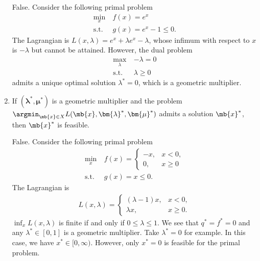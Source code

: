 \begin{exercise}
\begin{enumerate}
            \begin{solution}
                False. Consider the following primal problem
                \begin{align*}
                    \min_x\       & f(x) = e^x            \\
                    \text{s.t.}\  & g(x) = e^x - 1 \le 0.
                \end{align*}
                The Lagrangian is $L(x, \lambda) = e^x + \lambda e^x - \lambda$, whose infimum with respect to $x$ is $- \lambda$ but cannot be attained. However, the dual problem
                \begin{align*}
                    \max_{\lambda}\  & -\lambda = 0  \\
                    \text{s.t.}\     & \lambda \ge 0
                \end{align*}
                admits a unique optimal solution $\lambda^* = 0$, which is a geometric multiplier.
                \qedhere
            \end{solution}


        \item If $(\bm{\lambda}^*,\bm{\mu}^*)$ is a geometric multiplier and the problem $\argmin_{\mb{x}\in X} L(\mb{x}, \bm{\lambda}^*,\bm{\mu}^*)$ admits a solution $\mb{x}^*$, then $\mb{x}^*$ is feasible.

            \begin{solution}
                False. Consider the following primal problem
                \begin{align*}
                    \min_x\       & f(x) =
                    \begin{cases}
                        -x, & x < 0,  \\
                        0,  & x \ge 0
                    \end{cases}                   \\
                    \text{s.t.}\  & g(x) = x \le 0.
                \end{align*}
                The Lagrangian is
                \begin{align*}
                    L(x, \lambda) =
                    \begin{cases}
                        (\lambda - 1) x, & x < 0,   \\
                        \lambda x,       & x \ge 0.
                    \end{cases}
                \end{align*}
                $\inf_x L(x, \lambda)$ is finite if and only if $0 \le \lambda \le 1$. We see that $q^* = f^* = 0$ and any $\lambda^* \in [0,1]$ is a geometric multiplier. Take $\lambda^* = 0$ for example. In this case, we have $x^* \in [0, \infty)$. However, only $x^* = 0$ is feasible for the primal problem. \qedhere
            \end{solution}


\end{enumerate}
\end{exercise}
